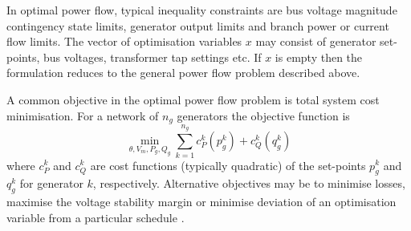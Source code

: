 In optimal power flow, typical inequality
constraints are bus voltage magnitude contingency state limits, generator
output limits and branch power or current flow limits.  The vector of
optimisation variables $x$ may consist of generator set-points, bus voltages,
transformer tap settings etc.  If $x$ is empty then
the formulation reduces to the general power flow problem described above.


A common objective in the optimal power flow problem is total system cost
minimisation. For a network of $n_g$ generators the objective function is
\begin{equation}
\label{eq:objfunc}
\min_{\theta, V_m, P_g, Q_g} \sum_{k=1}^{n_g} c^k_P(p_g^k) + c_Q^k(q_g^k)
\end{equation}
where $c_P^k$ and $c_Q^k$ are cost functions (typically quadratic) of the
set-points $p_g^k$ and $q_g^k$ for generator $k$, respectively. Alternative
objectives may be to minimise losses, maximise the voltage stability margin or
minimise deviation of an optimisation variable from a particular schedule
\cite[\S18]{kallrath:2009}.

